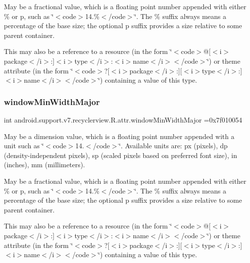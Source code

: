 May be a fractional value, which is a floating point number appended with either \% or p, such as \char`\"{}$<$code$>$14.\%$<$/code$>$\char`\"{}. The \% suffix always means a percentage of the base size; the optional p suffix provides a size relative to some parent container. 

This may also be a reference to a resource (in the form \char`\"{}$<$code$>$@\mbox{[}$<$i$>$package$<$/i$>$\+:\mbox{]}$<$i$>$type$<$/i$>$\+:$<$i$>$name$<$/i$>$$<$/code$>$\char`\"{}) or theme attribute (in the form \char`\"{}$<$code$>$?\mbox{[}$<$i$>$package$<$/i$>$\+:\mbox{]}\mbox{[}$<$i$>$type$<$/i$>$\+:\mbox{]}$<$i$>$name$<$/i$>$$<$/code$>$\char`\"{}) containing a value of this type. \mbox{\label{classandroid_1_1support_1_1v7_1_1recyclerview_1_1R_1_1attr_af3ebf027ce0b39b9865c14947839e898}} 
\subsubsection{\texorpdfstring{window\+Min\+Width\+Major}{windowMinWidthMajor}}
{\footnotesize\ttfamily int android.\+support.\+v7.\+recyclerview.\+R.\+attr.\+window\+Min\+Width\+Major =0x7f010054\hspace{0.3cm}{\ttfamily [static]}}

May be a dimension value, which is a floating point number appended with a unit such as \char`\"{}$<$code$>$14.\+5sp$<$/code$>$\char`\"{}. Available units are\+: px (pixels), dp (density-\/independent pixels), sp (scaled pixels based on preferred font size), in (inches), mm (millimeters). 

May be a fractional value, which is a floating point number appended with either \% or p, such as \char`\"{}$<$code$>$14.\%$<$/code$>$\char`\"{}. The \% suffix always means a percentage of the base size; the optional p suffix provides a size relative to some parent container. 

This may also be a reference to a resource (in the form \char`\"{}$<$code$>$@\mbox{[}$<$i$>$package$<$/i$>$\+:\mbox{]}$<$i$>$type$<$/i$>$\+:$<$i$>$name$<$/i$>$$<$/code$>$\char`\"{}) or theme attribute (in the form \char`\"{}$<$code$>$?\mbox{[}$<$i$>$package$<$/i$>$\+:\mbox{]}\mbox{[}$<$i$>$type$<$/i$>$\+:\mbox{]}$<$i$>$name$<$/i$>$$<$/code$>$\char`\"{}) containing a value of this type. \mbox{\label{classandroid_1_1support_1_1v7_1_1recyclerview_1_1R_1_1attr_af8259c37635b88a25eec7b014cb1cb19}} 
